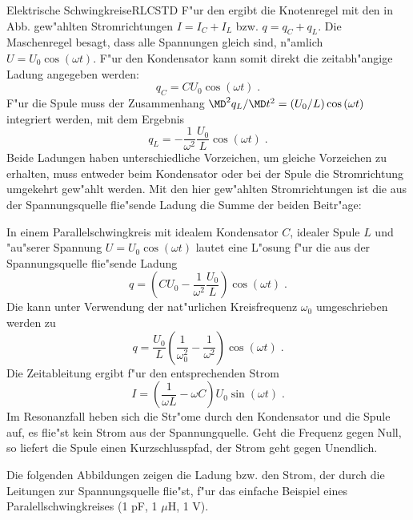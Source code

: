\begin{MXContent}{Elektrische Schwingkreise}{RLC}{STD}
F"ur den  ergibt die Knotenregel mit den in Abb.  gew"ahlten Stromrichtungen $I=I_C+I_L$ bzw. $q=q_C+q_L$. Die Maschenregel besagt, dass alle Spannungen gleich sind, n"amlich $U=U_0\cos\left(\omega t\right)$. F"ur den Kondensator kann somit direkt die zeitabh"angige Ladung angegeben werden:
\begin{equation}
  q_C= C U_0 \cos\left(\omega t\right)\; .
\end{equation}
F"ur die Spule muss der Zusammenhang $\MD^2 q_L / \MD t^2 = (U_0/L)\cos\left(\omega t\right)$ integriert werden, mit dem Ergebnis
\begin{equation}
  q_L= -\frac{1}{\omega^2}\frac{U_0}{L} \cos\left(\omega t\right)\; .
\end{equation}
Beide Ladungen haben unterschiedliche Vorzeichen, um gleiche Vorzeichen zu erhalten, muss entweder beim Kondensator oder bei der Spule die Stromrichtung umgekehrt gew"ahlt werden. Mit den hier gew"ahlten Stromrichtungen ist die aus der Spannungsquelle flie"sende Ladung die Summe der beiden Beitr"age:

\begin{MInfo}
In einem Parallelschwingkreis mit idealem Kondensator $C$, idealer Spule $L$ und "au"serer Spannung $U=U_0\cos\left(\omega t\right)$ lautet eine L"osung f"ur die aus der Spannungsquelle flie"sende Ladung
\begin{equation}
q=\left(C U_0 -\frac{1}{\omega^2}\frac{U_0}{L}\right) \cos\left(\omega t\right)\; .
\end{equation}
Die kann unter Verwendung der nat"urlichen Kreisfrequenz $\omega_0$ umgeschrieben werden zu
\begin{equation}
q=\frac{U_0}{L} \left( \frac{1}{\omega_0^2}-\frac{1}{\omega^2}\right) \cos\left(\omega t\right)\; .
\end{equation}
Die Zeitableitung ergibt f"ur den entsprechenden Strom
\begin{equation}
I=\left(\frac{1}{\omega L}-\omega C\right) U_0 \sin\left(\omega t\right)\; .
\end{equation}
Im Resonanzfall heben sich die Str"ome durch den Kondensator und die Spule auf, es flie"st kein Strom aus der Spannungquelle. Geht die Frequenz gegen Null, so liefert die Spule einen Kurzschlusspfad, der Strom geht gegen Unendlich.

\end{MInfo}

\begin{MExample}
Die folgenden Abbildungen zeigen die Ladung bzw. den Strom, der durch die Leitungen zur Spannungsquelle flie"st, f"ur das einfache Beispiel eines Paralellschwingkreises (1 pF, 1 $\mu$H, 1 V).
\begin{center}
\end{center}


\end{MExample}
\end{MXContent}
